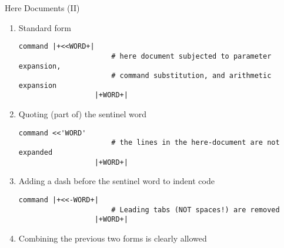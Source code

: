 \begin{frame}[fragile]{Here Documents (II)}
    \vspace{-5mm}
    \begin{enumerate}
        \item Standard form
              \begin{lstlisting}[style=MyBash, numbers=none, aboveskip=2mm, belowskip=-5mm]
                  command |+<<WORD+|
                      # here document subjected to parameter expansion,
                      # command substitution, and arithmetic expansion
                  |+WORD+|
              \end{lstlisting}
        \item Quoting (part of) the sentinel word
              \begin{lstlisting}[style=MyBash, numbers=none, aboveskip=2mm, belowskip=-5mm]
                  command <<'WORD'
                      # the lines in the here-document are not expanded
                  |+WORD+|
              \end{lstlisting}
        \item Adding a dash before the sentinel word to indent code
              \begin{lstlisting}[style=MyBash, numbers=none, aboveskip=2mm, belowskip=-5mm]
                  command |+<<-WORD+|
                      # Leading tabs (NOT spaces!) are removed
                  |+WORD+|
              \end{lstlisting}
        \item Combining the previous two forms is clearly allowed
    \end{enumerate}
\end{frame}
